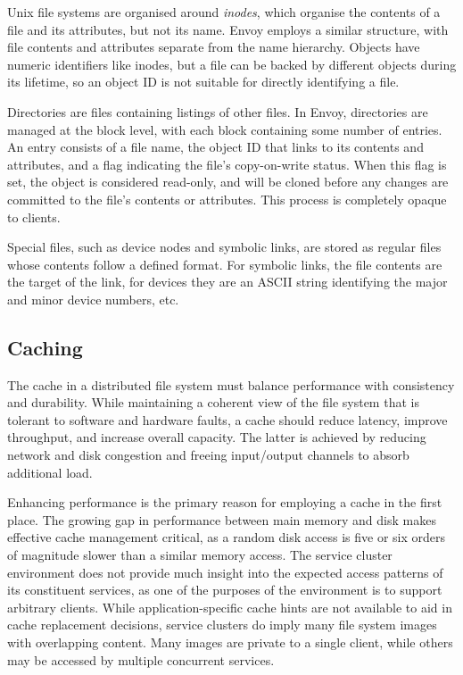 Unix file systems are organised around \emph{inodes}, which organise the contents of a file and its attributes, but not its name. Envoy employs a similar structure, with file contents and attributes separate from the name hierarchy. Objects have numeric identifiers like inodes, but a file can be backed by different objects during its lifetime, so an object ID is not suitable for directly identifying a file.

Directories are files containing listings of other files. In Envoy, directories are managed at the block level, with each block containing some number of entries. An entry consists of a file name, the object ID that links to its contents and attributes, and a flag indicating the file's copy-on-write status. When this flag is set, the object is considered read-only, and will be cloned before any changes are committed to the file's contents or attributes. This process is completely opaque to clients.

Special files, such as device nodes and symbolic links, are stored as regular files whose contents follow a defined format. For symbolic links, the file contents are the target of the link, for devices they are an ASCII string identifying the major and minor device numbers, etc.

\subsection{Caching}

The cache in a distributed file system must balance performance with consistency and durability. While maintaining a coherent view of the file system that is tolerant to software and hardware faults, a cache should reduce latency, improve throughput, and increase overall capacity. The latter is achieved by reducing network and disk congestion and freeing input/output channels to absorb additional load.

Enhancing performance is the primary reason for employing a cache in the first place. The growing gap in performance between main memory and disk makes effective cache management critical, as a random disk access is five or six orders of magnitude slower than a similar memory access. The service cluster environment does not provide much insight into the expected access patterns of its constituent services, as one of the purposes of the environment is to support arbitrary clients. While application-specific cache hints are not available to aid in cache replacement decisions, service clusters do imply many file system images with overlapping content. Many images are private to a single client, while others may be accessed by multiple concurrent services.

